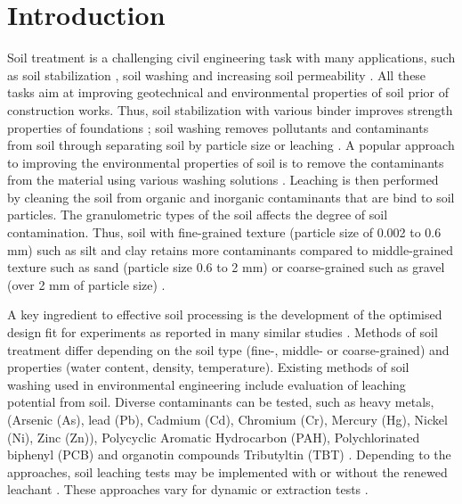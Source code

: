 \documentclass[algorithms,article,submit,pdftex,moreauthors]{Definitions/mdpi}
\begin{document}
\section{Introduction}

Soil treatment is a challenging civil engineering task with many applications, such as soil stabilization \cite{ref1,ma16113996,Lemenkova202305,app13084880}, soil washing and increasing soil permeability \cite{Rangeard,Lemenkova202222,Schultz}. All these tasks aim at improving geotechnical and environmental properties of soil prior of construction works. Thus, soil stabilization with various binder improves strength properties of foundations \cite{DHARINI2023,ELHARIRI202347,Lemenkova202210,ZHANG2023131887,Lemenkova202302}; soil washing removes pollutants and contaminants from soil through separating soil by particle size or leaching \cite{Fristad}. A popular approach to improving the environmental properties of soil is to remove the contaminants from the material using various washing solutions \cite{He,Mizutani2016}. Leaching is then performed by cleaning the soil from organic and inorganic contaminants that are bind to soil particles. The granulometric types of the soil affects the degree of soil contamination. Thus, soil with fine-grained texture (particle size of 0.002 to 0.6 mm) such as silt and clay retains more contaminants compared to middle-grained texture such as sand (particle size 0.6 to 2 mm) or coarse-grained such as gravel (over 2 mm of particle size) \cite{Binner}. 

A key ingredient to effective soil processing is the development of the optimised design fit for experiments as reported in many similar studies \cite{Rahinah,Ninic,Lemenkova202226,Zhang,Lemenkova202309,Wei}. Methods of soil treatment differ depending on the soil type (fine-, middle- or coarse-grained) and properties (water content, density, temperature). Existing methods of soil washing used in environmental engineering include evaluation of leaching potential from soil. Diverse contaminants can be tested, such as heavy metals, (Arsenic (As), lead (Pb), Cadmium (Cd), Chromium (Cr), Mercury (Hg), Nickel (Ni), Zinc (Zn)), Polycyclic Aromatic Hydrocarbon (PAH), Polychlorinated biphenyl (PCB) and organotin compounds Tributyltin (TBT) \cite{Lemenkova202214,Lemenkova202131}. Depending to the approaches, soil leaching tests may be implemented with or without the renewed leachant \cite{1997579}. These approaches vary for dynamic or extraction tests \cite{Lemenkova202208}. 
\end{document}
